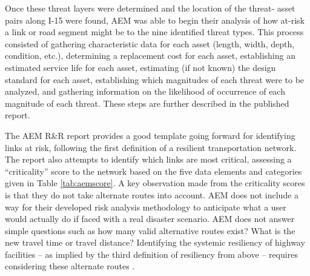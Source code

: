 Once these threat layers were determined and the location of the threat-
asset pairs along I-15
were found, AEM was able to begin their analysis of how at-risk a link or road
segment might be to the nine identified threat types. This process consisted of
gathering characteristic
data for each asset (length, width, depth, condition, etc.), determining a
replacement cost for
each asset, establishing an estimated service life for each asset,
estimating (if not known) the
design standard for each asset, establishing which magnitudes of each
threat were to be analyzed,
and gathering information on the likelihood of occurrence of each
magnitude of each threat. These
steps are further described in the published report.

The AEM R\&R report provides a good template going forward for identifying
links at risk,
following the first definition of a resilient transportation network. The
report also attempts to
identify which links are most critical, assessing a “criticality”
score to the network
based on the five data elements and categories given in Table \ref{tab:aemscore}.
A key observation made from the
criticality scores is that they do not take alternate routes into account.
AEM does not include a way for their developed risk analysis methodology
to anticipate what a user would actually do if faced with a real disaster
scenario. AEM does not answer simple questions such as how many valid
alternative routes exist? What is the new travel time or travel distance?
Identifying the systemic resiliency of highway facilities
– as implied by the third definition of resiliency from above – requires considering
these alternate routes \citep{aem2017}.

\begin{table}

\caption{AEM Criticality Score}
\label{tab:aemscore}
\end{table}

